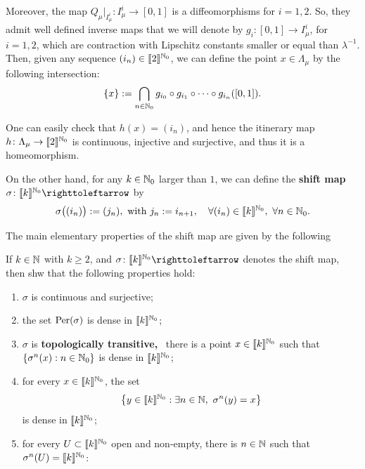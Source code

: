 Moreover, the map $Q_\mu\big|_{I_\mu^i}\colon I_\mu^i\to [0,1]$ is a diffeomorphisms for $i=1,2$. So, they admit well defined inverse maps that we will denote by $g_i\colon [0,1]\to I_\mu^i$, for $i=1,2$, which are contraction with Lipschitz constants smaller or equal than $\lambda^{-1}$.  Then, given any sequence $(i_n)\in\llbracket 2\rrbracket^{\mathbb{N}_0}$, we can define the point $x\in\Lambda_\mu$ by the following intersection:
\begin{displaymath}
  \{x\}:=\bigcap_{n\in\mathbb{N}_0} g_{i_0}\circ g_{i_1}\circ\cdots\circ g_{i_n}([0,1]).
\end{displaymath}

One can easily check that $h(x)=(i_n)$, and hence the itinerary map $h\colon\Lambda_\mu\to\llbracket 2\rrbracket^{\mathbb{N}_0}$ is continuous, injective and surjective, and thus it is a homeomorphism.

On the other hand, for any $k\in\mathbb{N}_0$ larger than $1$, we can define the \textbf{shift map} $\sigma\colon\db{k}^{\N_0}\carr$ by
\begin{displaymath}
  \sigma\big((i_n)\big):=(j_n),\ \text{with } j_n:=i_{n+1}, \quad\forall (i_n)\in\llbracket k\rrbracket^{\mathbb{N}_0},\ \forall n\in\mathbb{N}_0.
\end{displaymath}

The main elementary properties of the shift map are given by the following
\begin{exercise}
  If $k\in\mathbb{N}$ with $k\geq 2$, and $\sigma\colon\db{k}^{\N_0}\carr$ denotes the shift map, then shw that the following properties hold:
  \begin{enumerate}
    \item $\sigma$ is continuous and surjective;
    \item the set $\operatorname{Per}(\sigma)$ is dense in $\llbracket k\rrbracket^{\mathbb{N}_0}$;
    \item $\sigma$ is \textbf{topologically transitive,} \ie~there is a point $x\in\llbracket k\rrbracket^{\mathbb{N}_0}$ such that $\{\sigma^n(x) : n\in\mathbb{N}_0\}$ is dense in $\llbracket k\rrbracket^{\mathbb{N}_0}$;
    \item for every $x\in\llbracket k\rrbracket^{\mathbb{N}_0}$, the set
          \begin{displaymath}
            \left\{y\in\llbracket k\rrbracket^{\mathbb{N}_0} : \exists n\in\mathbb{N},\ \sigma^n(y)=x\right\}
          \end{displaymath}
          is dense in $\llbracket k\rrbracket^{\mathbb{N}_0}$;
    \item for every $U\subset\llbracket k\rrbracket^{\mathbb{N}_0}$ open and non-empty, there is $n\in\mathbb{N}$ such that $\sigma^n(U)=\llbracket k\rrbracket^{\mathbb{N}_0}$:
  \end{enumerate}
  \end{exercise}

